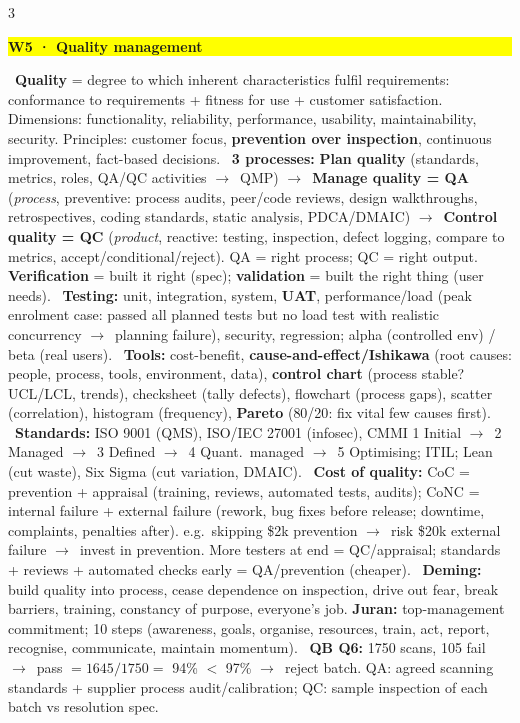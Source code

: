 \documentclass[a4paper,landscape]{article}
\newcommand{\hlhighlight}[1]{\begingroup\setlength{\fboxsep}{0pt}\colorbox{yellow}{\strut\textbf{#1}}\endgroup}
\newcommand{\concept}[1]{\textbf{#1}}
\newcommand{\lbl}[1]{\textbf{#1}}
\newcommand{\kh}[1]{{\setlength{\fboxsep}{0.5pt}\colorbox{keyhlcolor}{#1}}}
\newcommand{\ra}{$\rightarrow$}
\begin{document}
\begin{multicols}{3}
\par\smallskip\noindent\hlhighlight{W5 · Quality management}\ \concept{Quality} = \kh{degree to which inherent characteristics} fulfil requirements: conformance to requirements + fitness for use + customer satisfaction. Dimensions: functionality, reliability, performance, usability, maintainability, security. Principles: customer focus, \lbl{prevention over inspection}, continuous improvement, fact-based decisions. \textbullet\ \concept{3 processes:} \lbl{Plan quality} (standards, metrics, roles, QA/QC activities \ra\ QMP) \ra\ \lbl{Manage quality = QA} (\emph{process}, preventive: process audits, peer/code reviews, design walkthroughs, retrospectives, coding standards, static analysis, PDCA/DMAIC) \ra\ \lbl{Control quality = QC} (\emph{product}, reactive: testing, inspection, defect logging, compare to metrics, accept/conditional/reject). \kh{QA = right process; QC = right output.} \lbl{Verification} = built it right (spec); \lbl{validation} = built the right thing (user needs). \textbullet\ \concept{Testing:} unit, integration, system, \lbl{UAT}, performance/load (peak enrolment case: passed all planned tests but no load test with realistic concurrency \ra\ planning failure), security, regression; alpha (controlled env) / beta (real users). \textbullet\ \concept{Tools:} cost-benefit, \lbl{cause-and-effect/Ishikawa} (root causes: people, process, tools, environment, data), \lbl{control chart} (process stable? UCL/LCL, trends), checksheet (tally defects), flowchart (process gaps), scatter (correlation), histogram (frequency), \lbl{Pareto} (\kh{80/20}: fix vital few causes first). \textbullet\ \concept{Standards:} ISO 9001 (QMS), ISO/IEC 27001 (infosec), CMMI 1 Initial \ra\ 2 Managed \ra\ 3 Defined \ra\ 4 Quant.\ managed \ra\ 5 Optimising; ITIL; Lean (cut waste), Six Sigma (cut variation, DMAIC). \textbullet\ \concept{Cost of quality:} \kh{CoC = prevention + appraisal} (training, reviews, automated tests, audits); \kh{CoNC = internal failure + external failure} (rework, bug fixes before release; downtime, complaints, penalties after). e.g.\ skipping \$2k prevention \ra\ risk \$20k external failure \ra\ invest in prevention. More testers at end = QC/appraisal; standards + reviews + automated checks early = QA/prevention (cheaper). \textbullet\ \concept{Deming:} build quality into process, cease dependence on inspection, drive out fear, break barriers, training, constancy of purpose, everyone's job. \concept{Juran:} top-management commitment; 10 steps (awareness, goals, organise, resources, train, act, report, recognise, communicate, maintain momentum). \textbullet\ \lbl{QB Q6:} 1750 scans, 105 fail \ra\ pass $=1645/1750=$ \kh{94\% $<$ 97\%} \ra\ reject batch. QA: agreed scanning standards + supplier process audit/calibration; QC: sample inspection of each batch vs resolution spec.\par


\end{multicols}
\end{document}
